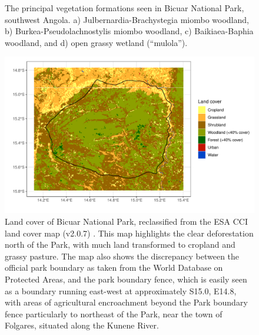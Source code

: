 \begin{refsection}
\begin{figure}[tb]
	\hfil

	\label{intro:bicuar_photos}
	\caption[Bicuar National Park vegetation type photographs]{The principal vegetation formations seen in Bicuar National Park, southwest Angola. a) Julbernardia-Brachystegia miombo woodland, b) Burkea-Pseudolachnostylis miombo woodland, c) Baikiaea-Baphia woodland, and d) open grassy wetland (``mulola'').}
\end{figure}

\begin{figure}[tb]
\centering
	\includegraphics[width=\textwidth]{img/bicuar_land_cover}
	\caption[Bicuar National Park land cover]{Land cover of Bicuar National Park, reclassified from the ESA CCI land cover map (v2.0.7) \citep{ESACCI}. This map highlights the clear deforestation north of the Park, with much land transformed to cropland and grassy pasture. The map also shows the discrepancy between the official park boundary as taken from the World Database on Protected Areas, and the park boundary fence, which is easily seen as a boundary running east-west at approximately S15.0\textdegree{}, E14.8\textdegree{}, with areas of agricultural encroachment beyond the Park boundary fence particularly to northeast of the Park, near the town of Folgares, situated along the Kunene River.}
	\label{intro:bicuar_land_cover}
\end{figure}



\end{refsection}
